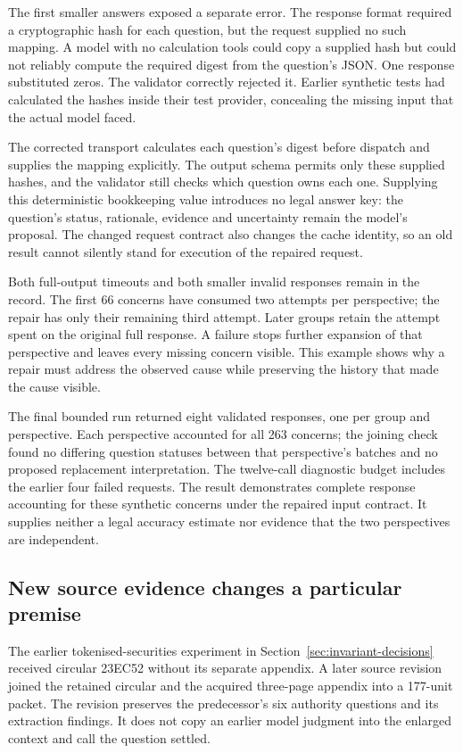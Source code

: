 The first smaller answers exposed a separate error. The response format
required a cryptographic hash for each question, but the request supplied no
such mapping. A model with no calculation tools could copy a supplied hash
but could not reliably compute the required digest from the question's JSON.
One response substituted zeros. The validator correctly rejected it. Earlier
synthetic tests had calculated the hashes inside their test provider, concealing
the missing input that the actual model faced.

The corrected transport calculates each question's digest before dispatch and
supplies the mapping explicitly. The output schema permits only these supplied
hashes, and the validator still checks which question owns each one. Supplying
this deterministic bookkeeping value introduces no legal answer key: the
question's status, rationale, evidence and uncertainty remain the model's
proposal. The changed request contract also changes the cache identity, so an
old result cannot silently stand for execution of the repaired request.

Both full-output timeouts and both smaller invalid responses remain in the
record. The first 66 concerns have consumed two attempts per perspective;
the repair has only their remaining third attempt. Later groups retain the
attempt spent on the original full response. A failure stops further expansion
of that perspective and leaves every missing concern visible. This example
shows why a repair must address the observed cause while preserving the
history that made the cause visible.

The final bounded run returned eight validated responses, one per group and
perspective. Each perspective accounted for all 263 concerns; the joining
check found no differing question statuses between that perspective's batches
and no proposed replacement interpretation. The twelve-call diagnostic budget
includes the earlier four failed requests. The result demonstrates complete
response accounting for these synthetic concerns under the repaired input
contract. It supplies neither a legal accuracy estimate nor evidence that
the two perspectives are independent.

\subsection{New source evidence changes a particular premise}

The earlier tokenised-securities experiment in
Section~\ref{sec:invariant-decisions} received circular 23EC52 without its
separate appendix. A later source revision joined the retained circular and
the acquired three-page appendix into a 177-unit packet. The revision preserves
the predecessor's six authority questions and its extraction findings. It does
not copy an earlier model judgment into the enlarged context and call the
question settled.

